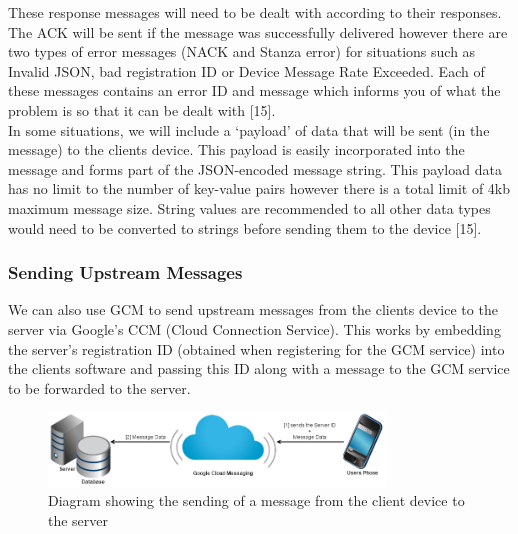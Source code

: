 \documentclass{article}
\begin{document}
These response messages will need to be dealt with according to their responses. The ACK will be sent if the message was successfully delivered however there are two types of error messages (NACK and Stanza error) for situations such as Invalid JSON, bad registration ID or Device Message Rate Exceeded. Each of these messages contains an error ID and message which informs you of what the problem is so that it can be dealt with [15].\\

In some situations, we will include a ‘payload’ of data that will be sent (in the message) to the clients device. This payload is easily incorporated into the message and forms part of the JSON-encoded message string. This payload data has no limit to the number of key-value pairs however there is a total limit of 4kb maximum message size. String values are recommended to all other data types would need to be converted to strings before sending them to the device [15].\\
		
		\subsubsection{Sending Upstream Messages}
		We can also use GCM to send upstream messages from the clients device to the server via Google’s CCM (Cloud Connection Service). This works by embedding the server’s registration ID (obtained when registering for the GCM service) into the clients software and passing this ID along with a message to the GCM service to be forwarded to the server.\\
		
	\begin{figure}[H]
		\centering
		\includegraphics[width=0.8\textwidth]{"GSM Sending a message upstream"}
		\caption{Diagram showing the sending of a message from the client device to the server}
	\end{figure}
	
\end{document}
